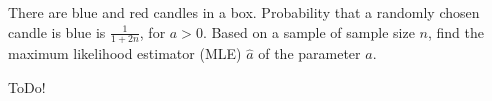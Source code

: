 
\begin{exercise}

There are blue and red candles in a box.
Probability that a randomly chosen candle is blue is $\frac{1}{1 + 2 n}$, for $a > 0$.
Based on a sample of sample size $n$, find the maximum likelihood estimator (MLE) $\hat a$ of the parameter $a$.

\end{exercise}


\begin{solution}

ToDo!

\end{solution}

